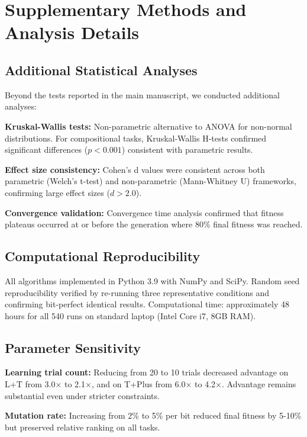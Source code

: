 \documentclass[12pt]{article}
\begin{document}
\newpage

\section*{Supplementary Methods and Analysis Details}

\subsection*{Additional Statistical Analyses}

Beyond the tests reported in the main manuscript, we conducted additional analyses:

\textbf{Kruskal-Wallis tests:} Non-parametric alternative to ANOVA for non-normal distributions. For compositional tasks, Kruskal-Wallis H-tests confirmed significant differences ($p < 0.001$) consistent with parametric results.

\textbf{Effect size consistency:} Cohen's d values were consistent across both parametric (Welch's t-test) and non-parametric (Mann-Whitney U) frameworks, confirming large effect sizes ($d > 2.0$).

\textbf{Convergence validation:} Convergence time analysis confirmed that fitness plateaus occurred at or before the generation where 80\% final fitness was reached.

\subsection*{Computational Reproducibility}

All algorithms implemented in Python 3.9 with NumPy and SciPy. Random seed reproducibility verified by re-running three representative conditions and confirming bit-perfect identical results. Computational time: approximately 48 hours for all 540 runs on standard laptop (Intel Core i7, 8GB RAM).

\subsection*{Parameter Sensitivity}

\textbf{Learning trial count:} Reducing from 20 to 10 trials decreased advantage on L+T from 3.0$\times$ to 2.1$\times$, and on T+Plus from 6.0$\times$ to 4.2$\times$. Advantage remains substantial even under stricter constraints.

\textbf{Mutation rate:} Increasing from 2\% to 5\% per bit reduced final fitness by 5-10\% but preserved relative ranking on all tasks.
\end{document}
